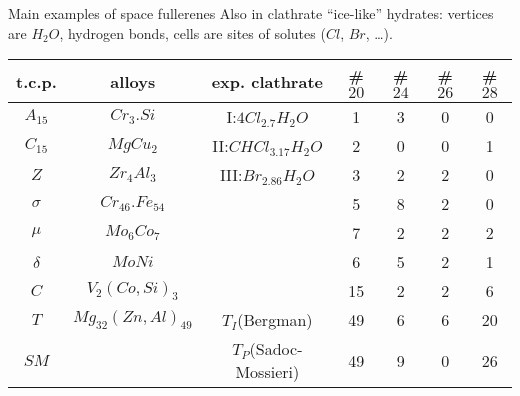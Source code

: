 \documentclass[%
pdf,
colorBG,
slideColor,
]{prosper}
\begin{document}
\begin{slide}{Main examples of space fullerenes}
Also in clathrate ``ice-like'' hydrates: vertices are
$H_2O$, hydrogen bonds, cells are sites of solutes
($Cl$, $Br$, \dots). 




{\scriptsize
\begin{center}
\begin{tabular}{|c|c|c|c|c|c|c|}
\hline
t.c.p.   & alloys  & exp. clathrate  &\# $20$&\# $24$&\# $26$&\# $28$\\
\hline
$A_{15}$ &$Cr_{3}.Si$  & I:$4Cl_2.7H_2O$       &1  &3 &0 &0\\
$C_{15}$ &$MgCu_2$     & II:$CHCl_3.17H_2O$    &2  &0 &0 &1\\
$Z$      &$Zr_4Al_3$   & III:$Br_2.86H_2O$     &3  &2 &2 &0\\
$\sigma$ &$Cr_{46}.Fe_{54}$ &                  &5  &8 &2 &0\\
$\mu$    &$Mo_6Co_7$   &                       &7  &2 &2 &2\\
$\delta$ &$MoNi$       &                       &6  &5 &2 &1\\
$C$      &$V_2(Co,Si)_3$&                      &15 &2 &2 &6\\
$T$      &$Mg_{32}(Zn,Al)_{49}$& $T_I$(Bergman)&49 &6 &6 &20\\
$SM$     &             &$T_P$(Sadoc-Mossieri)  &49 &9 &0 &26\\
\hline
\end{tabular}
\end{center}
}




\end{slide}


%
\end{document}
